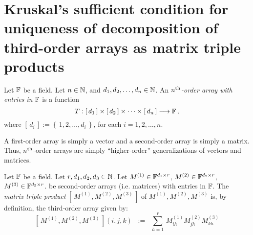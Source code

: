 

\cite{Allman2009} \cite{Rhodes2010} \cite{Fienberg2010}

\section{Kruskal's sufficient condition for uniqueness of decomposition of third-order arrays as matrix triple products}
\setcounter{theorem}{0}
\setcounter{equation}{0}

\renewcommand{\theenumi}{\roman{enumi}}
\renewcommand{\labelenumi}{\textnormal{(\theenumi)}$\;\;$}

\begin{definition}
\label{nThOrderArray}
\mbox{}\vskip 0.05cm
\noindent
Let $\mathbb{F}$ be a field. Let $n \in \mathbb{N}$, and $d_{1}, d_{2}, \ldots, d_{n} \in \mathbb{N}$.
An \emph{$n^{\textnormal{th}}$-order array with entries in $\mathbb{F}$} is a function
\begin{equation*}
T : \left[\,d_{1}\,\right] \times \left[\,d_{2}\,\right] \times \cdots \times \left[\,d_{n}\,\right] \longrightarrow \mathbb{F}\,,
\end{equation*}
where $\left[\,d_{i}\,\right] := \left\{\,1,2,\ldots,d_{i}\,\right\}$, for each $i = 1,2,\ldots, n$.
\end{definition}

\begin{remark}
\mbox{}\vskip 0.05cm
\noindent
A first-order array is simply a vector and a second-order array is simply a matrix.
Thus, $n^{\textnormal{th}}$-order arrays are simply ``higher-order'' generalizations of vectors and matrices. 
\end{remark}

\begin{definition}
\label{MatrixTripleProduct}
\mbox{}\vskip 0.05cm
\noindent
Let $\mathbb{F}$ be a field.
Let $r, d_{1}, d_{2}, d_{3} \in \mathbb{N}$.
Let $M^{(1)} \in \mathbb{F}^{d_{1} \times r}$, $M^{(2)} \in \mathbb{F}^{d_{2} \times r}$, $M^{(3)} \in \mathbb{F}^{d_{3} \times r}$.
be second-order arrays (i.e. matrices) with entries in $\mathbb{F}$.
The \emph{matrix triple product} $\left[\,M^{(1)},M^{(2)},M^{(3)}\,\right]$ of $M^{(1)}, M^{(2)}, M^{(3)}$
is, by definition, the third-order array given by:
\begin{equation*}
\left[\,M^{(1)},M^{(2)},M^{(3)}\,\right](i,j,k)
\;\; := \;\;
\sum_{h = 1}^{r}\, M^{(1)}_{ih} M^{(2)}_{jh} M^{(3)}_{kh}
\end{equation*}
\end{definition}

